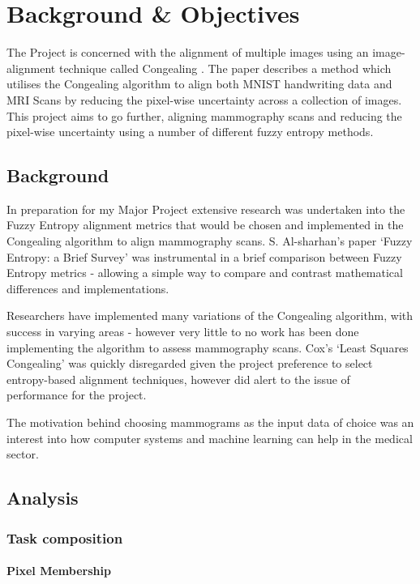 \chapter{Background \& Objectives}

The Project is concerned with the alignment of multiple images using an image-alignment technique called Congealing \cite{joint-alignment}. The paper describes a method which utilises the Congealing algorithm to align both MNIST handwriting data and MRI Scans by reducing the pixel-wise uncertainty across a collection of images. This project aims to go further, aligning mammography scans and reducing the pixel-wise uncertainty using a number of different fuzzy entropy methods.

\section{Background}
In preparation for my Major Project extensive research was undertaken into the Fuzzy Entropy alignment metrics that would be chosen and implemented in the Congealing algorithm to align mammography scans. S. Al-sharhan's paper `Fuzzy Entropy: a Brief Survey' \cite{fuzzy-entropy} was instrumental in a brief comparison between Fuzzy Entropy metrics - allowing a simple way to compare and contrast mathematical differences and implementations.

Researchers have implemented many variations of the Congealing algorithm, with success in varying areas - however very little to no work has been done implementing the algorithm to assess mammography scans. Cox's `Least Squares Congealing' \cite{Cox_Sridharan_Lucey_Cohn_2008} was quickly disregarded given the project preference to select entropy-based alignment techniques, however did alert to the issue of performance for the project.

The motivation behind choosing mammograms as the input data of choice was an interest into how computer systems and machine learning can help in the medical sector.

\section{Analysis}

\subsection{Task composition}

\subsubsection{Pixel Membership}


